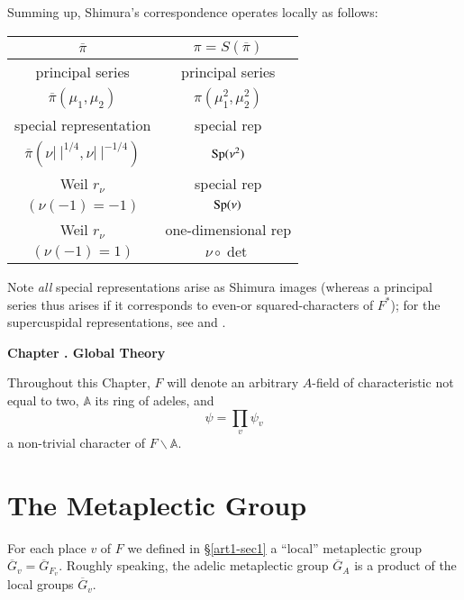 \subsection{}\label{art1-sec7.6}\pageoriginale
Summing up, Shimura's correspondence operates locally as follows:
\begin{center}
\tabcolsep=10pt
\renewcommand{\arraystretch}{1.1}
\begin{tabular}{c|c}
$\overline{\pi}$ & $\pi=S(\overline{\pi})$\\
\hline
principal series & principal series\\
$\overline{\pi}(\mu_{1},\mu_{2})$ & $\pi(\mu^{2}_{1},\mu^{2}_{2})$\\
\hline
special representation & special rep\\
$\overline{\pi}(\nu|~|^{1/4},\nu|~|^{-1/4})$ & $\operatorname{Sp}(\nu^{2})$\\
\hline
Weil $r_{\nu}$ & special rep\\
$(\nu(-1)=-1)$ & $\operatorname{Sp}(\nu)$\\
\hline
Weil $r_{\nu}$ & one-dimensional rep\\
$(\nu(-1)=1)$ & $\nu\circ \det$
\end{tabular}
\end{center}
Note {\em all} special representations arise as Shimura images (whereas a principal series thus arises if it corresponds to even-or squared-characters of $F^{*}$); for the supercuspidal representations, see \cite{Flicker} and \cite{Meister}.

\bigskip
\begin{center}
{\large\bfseries Chapter .\label{art1-chap-II} Global Theory}
\end{center}
\smallskip

Throughout this Chapter, $F$ will denote an arbitrary $A$-field of characteristic not equal to two, $\mathbb{A}$ its ring of adeles, and
$$
\psi=\prod\limits_{v}\psi_{v}
$$
a non-trivial character of $F\backslash \mathbb{A}$.

\section{The Metaplectic Group}\label{art1-sec8}

For each place $v$ of $F$ we defined in \S\ref{art1-sec1} a ``local'' metaplectic group $\overline{G}_{v}=\overline{G}_{F_{v}}$. Roughly speaking, the adelic metaplectic group $\overline{G}_{A}$ is a product of the local groups $\overline{G}_{v}$.

